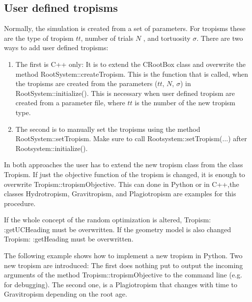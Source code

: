 \documentclass[a4paper]{article}
\begin{document}
\subsection{User defined tropisms} \label{sec:usertropism}

Normally, the simulation is created from a set of parameters. For tropisms these are the type of tropism $tt$, number of trials $N$ , and tortuosity $\sigma$.
There are two ways to add user defined tropisms: 

\begin{enumerate}
\item The first is C++ only: It is to extend the CRootBox class and overwrite the method RootSystem::createTropism. 
This is the function that is called, when the tropisms are created from the parameters ($tt$, $N$, $\sigma$) in RootSystem::initialize(). 
This is necessary when user defined tropism are created from a parameter file, where $tt$ is the number of the new tropism type. 
\item The second is to manually set the tropisms using the method RootSystem::setTropism. Make sure to call Rootsystem::setTropism($\dots$) after Rootsystem::initialize().
\end{enumerate}

In both approaches the user has to extend the new tropism class from the class Tropism. 
If just the objective function of the tropism is changed, it is enough to overwrite Tropism::tropismObjective. 
This can done in Python or in C++,the classes Hydrotropism, Gravitropism, and Plagiotropism are examples for this procedure.

If the whole concept of the random optimization is altered, Tropism: :getUCHeading must be overwritten. 
If the geometry model is also changed Tropism: :getHeading must be overwritten.

The following example shows how to implement a new tropism in Python. Two new tropism are introduced:
The first does nothing put to output the incoming arguments of the method Tropism::tropismObjective to the command line (e.g. for debugging).  
The second one, is a Plagiotropism that changes with time to Gravitropism depending on the root age.


\end{document}
